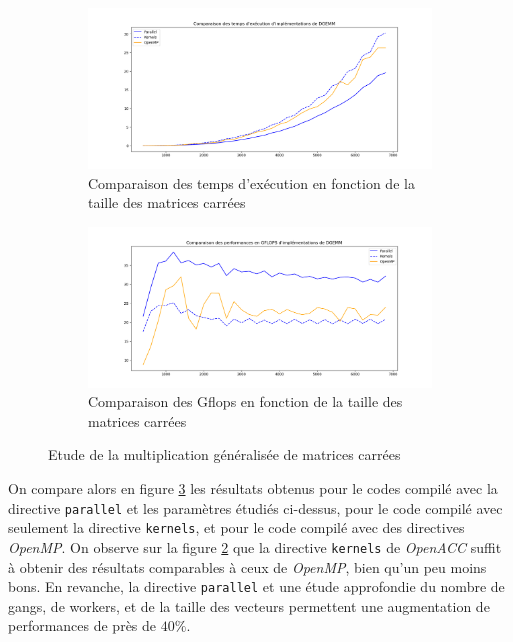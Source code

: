 \documentclass{article}
\begin{document}
\begin{figure}[!htb]

	\begin{subfigure}{\textwidth}
		\centering
		\includegraphics[width=\linewidth]{Time_DGEMM.png}
		\caption{Comparaison des temps d'exécution en fonction de la taille des matrices carrées}
		\label{fig:time_dgemm}
	\end{subfigure}

	\begin{subfigure}{\textwidth}
		\centering
		\includegraphics[width=\linewidth]{Flops_DGEMM.png}
		\caption{Comparaison des G\gls{flops} en fonction de la taille des matrices carrées}
		\label{fig:flops_dgemm}
	\end{subfigure}
	\caption{Etude de la multiplication généralisée de matrices carrées}
	\label{fig:dgemm_acc_ker_omp}
\end{figure}

On compare alors en figure \ref{fig:dgemm_acc_ker_omp} les résultats obtenus pour le codes compilé avec la directive \texttt{parallel} et les paramètres étudiés ci-dessus, pour le code compilé avec seulement la directive \texttt{kernels}, et pour le code compilé avec des directives \textit{OpenMP}. On observe sur la figure \ref{fig:flops_dgemm} que la directive \texttt{kernels} de \textit{OpenACC} suffit à obtenir des résultats comparables à ceux de \textit{OpenMP}, bien qu'un peu moins bons. En revanche, la directive \texttt{parallel} et une étude approfondie du nombre de gangs, de workers, et de la taille des vecteurs permettent une augmentation de performances de près de $40\%$.
\end{document}
